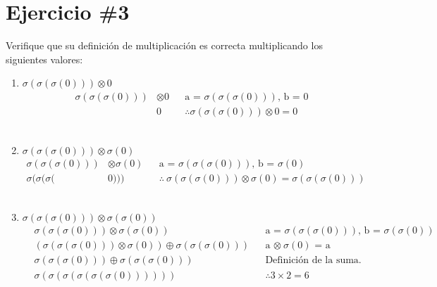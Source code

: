 \documentclass[11pt,letterpaper]{article}
\begin{document}
\section*{Ejercicio \#3}
\noindent Verifique que su definición de multiplicación es correcta multiplicando los siguientes valores:
\begin{enumerate}
	\item{$\sigma(\sigma(\sigma(0)))\otimes 0$}
	\begin{align}
	\sigma(\sigma(\sigma(0))) &\otimes 0 && \text{a\ =\ $\sigma(\sigma(\sigma(0)))$, b\ =\ $0$} \\
	&0 && \text{$\therefore \sigma(\sigma(\sigma(0))) \otimes 0 = 0$}
	\end{align}
	\\
	
	\item{$\sigma(\sigma(\sigma(0)))\otimes \sigma(0)$}
	\begin{align}
	\sigma(\sigma(\sigma(0))) &\otimes \sigma(0) && \text{a\ =\ $\sigma(\sigma(\sigma(0)))$, b\ =\ $\sigma(0)$} \\
	\sigma(\sigma(\sigma(&0))) && \text{$\therefore \ \sigma(\sigma(\sigma(0))) \otimes \sigma(0)=\sigma(\sigma(\sigma(0)))$}
	\end{align}		
	\\		
	
	\item{$\sigma(\sigma(\sigma(0)))\otimes \sigma(\sigma(0))$}
	\begin{align}
	&\sigma(\sigma(\sigma(0))) \otimes \sigma(\sigma(0)) && \text{a\ =\ $\sigma(\sigma(\sigma(0)))$, b\ =\ $\sigma(\sigma(0))$} \\
	&(\sigma(\sigma(\sigma(0))) \otimes \sigma(0)) \oplus \sigma(\sigma(\sigma(0))) && \text{a\ $\otimes\ \sigma(0)$\ =\ a} \\
	&\sigma(\sigma(\sigma(0))) \oplus \sigma(\sigma(\sigma(0))) && \text{Definición de la suma.} \\
	&\sigma(\sigma(\sigma(\sigma(\sigma(\sigma(0)))))) && \therefore 3\times2=6
	\end{align}		
	
\end{enumerate}
\vspace{0.05cm}
\end{document}

